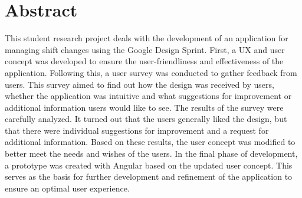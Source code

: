 \section*{Abstract}

This student research project deals with the development of an application for managing shift changes using the Google Design Sprint. First, a UX and user concept was developed to ensure the user-friendliness and effectiveness of the application. Following this, a user survey was conducted to gather feedback from users. This survey aimed to find out how the design was received by users, whether the application was intuitive and what suggestions for improvement or additional information users would like to see. The results of the survey were carefully analyzed. It turned out that the users generally liked the design, but that there were individual suggestions for improvement and a request for additional information. Based on these results, the user concept was modified to better meet the needs and wishes of the users. In the final phase of development, a prototype was created with Angular based on the updated user concept. This serves as the basis for further development and refinement of the application to ensure an optimal user experience.